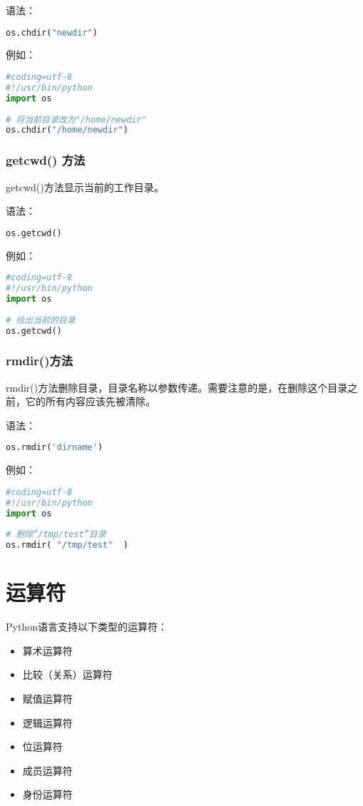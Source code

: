 语法：
 \begin{lstlisting}[language=Python]
os.chdir("newdir")
  \end{lstlisting}

例如：
 \begin{lstlisting}[language=Python]
#coding=utf-8
#!/usr/bin/python
import os
 
# 将当前目录改为"/home/newdir"
os.chdir("/home/newdir")
  \end{lstlisting}



\subsubsection{getcwd() 方法}
getcwd()方法显示当前的工作目录。

语法：
 \begin{lstlisting}[language=Python]
os.getcwd()
  \end{lstlisting}

例如：
 \begin{lstlisting}[language=Python]
#coding=utf-8
#!/usr/bin/python
import os
 
# 给出当前的目录
os.getcwd()
  \end{lstlisting}



\subsubsection{rmdir()方法}
rmdir()方法删除目录，目录名称以参数传递。需要注意的是，在删除这个目录之前，它的所有内容应该先被清除。

语法：
 \begin{lstlisting}[language=Python]
os.rmdir('dirname')
  \end{lstlisting}

例如：
 \begin{lstlisting}[language=Python]
#coding=utf-8
#!/usr/bin/python
import os
 
# 删除”/tmp/test”目录
os.rmdir( "/tmp/test"  )
  \end{lstlisting}









\section{运算符}
Python语言支持以下类型的运算符：
\begin{itemize}
\item 算术运算符
\item 比较（关系）运算符
\item 赋值运算符
\item 逻辑运算符
\item 位运算符
\item 成员运算符
\item 身份运算符
\end{itemize}


